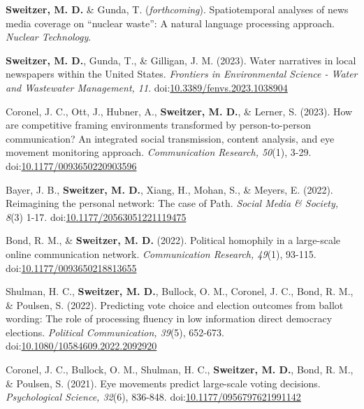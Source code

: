 \documentclass[letterpaper, 10pt]{extarticle}
\renewenvironment{itemize}{
  \begin{list}{}{
    \setlength{\leftmargin}{10pt}
  }
}{
  \end{list}
}
\begin{document}
\begin{itemize}
\setlength\itemindent{-0.5em}
\item \textbf{Sweitzer, M. D.} \& Gunda, T. (\textit{forthcoming}). Spatiotemporal analyses of news media coverage on ``nuclear waste'': A natural language processing approach. \textit{Nuclear Technology}.

\item \textbf{Sweitzer, M. D.}, Gunda, T., \& Gilligan, J. M. (2023). Water narratives in local newspapers within the United States. \textit{Frontiers in Environmental Science - Water and Wastewater Management, 11}. doi:\href{https://github.com/Matt-Sweitzer/Papers/blob/master/Sweitzer2023.pdf}{10.3389/fenvs.2023.1038904}

\item Coronel, J. C., Ott, J., Hubner, A., \textbf{Sweitzer, M. D.}, \& Lerner, S. (2023). How are competitive framing environments transformed by person-to-person communication? An integrated social transmission, content analysis, and eye movement monitoring approach. \textit{Communication Research, 50}(1), 3-29. doi:\href{https://github.com/Matt-Sweitzer/Papers/blob/master/Coroneletal2020a.pdf}{10.1177/0093650220903596}

\item Bayer, J. B., \textbf{Sweitzer, M. D.}, Xiang, H., Mohan, S., \& Meyers, E. (2022). Reimagining the personal network: The case of Path. \textit{Social Media \& Society, 8}(3) 1-17. doi:\href{https://github.com/Matt-Sweitzer/Papers/blob/master/Bayeretal2022.pdf}{10.1177/20563051221119475}

\item Bond, R. M., \& \textbf{Sweitzer, M. D.} (2022). Political homophily in a large-scale online communication network. \textit{Communication Research, 49}(1), 93-115. doi:\href{https://github.com/Matt-Sweitzer/Papers/blob/master/BondSweitzer2018.pdf}{10.1177/0093650218813655}

\item Shulman, H. C., \textbf{Sweitzer, M. D.}, Bullock, O. M., Coronel, J. C., Bond, R. M., \& Poulsen, S. (2022). Predicting vote choice and election outcomes from ballot wording: The role of processing fluency in low information direct democracy elections. \textit{Political Communication, 39}(5), 652-673. doi:\href{https://github.com/Matt-Sweitzer/Papers/blob/master/Shulmanetal2022.pdf}{10.1080/10584609.2022.2092920}

\item Coronel, J. C., Bullock, O. M., Shulman, H. C., \textbf{Sweitzer, M. D.}, Bond, R. M., \& Poulsen, S. (2021). Eye movements predict large-scale voting decisions. \textit{Psychological Science, 32}(6), 836-848. doi:\href{https://github.com/Matt-Sweitzer/Papers/blob/master/Coroneletal2021.pdf}{10.1177/0956797621991142}


\end{itemize}
\end{document}
